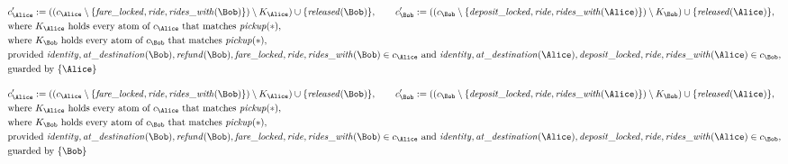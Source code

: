 \begin{align*}
&
c'_
{
\Alice
}
 := 
(
(c_
{
\Alice
}
 \setminus 
\{
\mathit{\detokenize{
fare_locked
}}
,
\mathit{\detokenize{
ride
}}
,
\mathit{\detokenize{
rides_with
}}
(
\Bob
)
\}
) \setminus K_
{
\Alice
}
) \cup 
\{
\mathit{\detokenize{
released
}}
(
\Bob
)
\}
, \qquad 
c'_
{
\Bob
}
 := 
(
(c_
{
\Bob
}
 \setminus 
\{
\mathit{\detokenize{
deposit_locked
}}
,
\mathit{\detokenize{
ride
}}
,
\mathit{\detokenize{
rides_with
}}
(
\Alice
)
\}
) \setminus K_
{
\Bob
}
) \cup 
\{
\mathit{\detokenize{
released
}}
(
\Alice
)
\}
,\\
&
\text{where } K_
{
\Alice
}
 \text{ holds every atom of } c_
{
\Alice
}
 \text{ that matches } 
\mathit{\detokenize{
pickup
}}
(
\ast
)
,\\
&
\text{where } K_
{
\Bob
}
 \text{ holds every atom of } c_
{
\Bob
}
 \text{ that matches } 
\mathit{\detokenize{
pickup
}}
(
\ast
)
,\\
&
\text{provided } 
\mathit{\detokenize{
identity
}}
,
\mathit{\detokenize{
at_destination
}}
(
\Bob
)
,
\mathit{\detokenize{
refund
}}
(
\Bob
)
,
\mathit{\detokenize{
fare_locked
}}
,
\mathit{\detokenize{
ride
}}
,
\mathit{\detokenize{
rides_with
}}
(
\Bob
)
 \in c_
{
\Alice
}
 \text{ and } 
\mathit{\detokenize{
identity
}}
,
\mathit{\detokenize{
at_destination
}}
(
\Alice
)
,
\mathit{\detokenize{
deposit_locked
}}
,
\mathit{\detokenize{
ride
}}
,
\mathit{\detokenize{
rides_with
}}
(
\Alice
)
 \in c_
{
\Bob
}
,\\
&
\text{guarded by } \{
\Alice
\}
\end{align*}

\begin{align*}
&
c'_
{
\Alice
}
 := 
(
(c_
{
\Alice
}
 \setminus 
\{
\mathit{\detokenize{
fare_locked
}}
,
\mathit{\detokenize{
ride
}}
,
\mathit{\detokenize{
rides_with
}}
(
\Bob
)
\}
) \setminus K_
{
\Alice
}
) \cup 
\{
\mathit{\detokenize{
released
}}
(
\Bob
)
\}
, \qquad 
c'_
{
\Bob
}
 := 
(
(c_
{
\Bob
}
 \setminus 
\{
\mathit{\detokenize{
deposit_locked
}}
,
\mathit{\detokenize{
ride
}}
,
\mathit{\detokenize{
rides_with
}}
(
\Alice
)
\}
) \setminus K_
{
\Bob
}
) \cup 
\{
\mathit{\detokenize{
released
}}
(
\Alice
)
\}
,\\
&
\text{where } K_
{
\Alice
}
 \text{ holds every atom of } c_
{
\Alice
}
 \text{ that matches } 
\mathit{\detokenize{
pickup
}}
(
\ast
)
,\\
&
\text{where } K_
{
\Bob
}
 \text{ holds every atom of } c_
{
\Bob
}
 \text{ that matches } 
\mathit{\detokenize{
pickup
}}
(
\ast
)
,\\
&
\text{provided } 
\mathit{\detokenize{
identity
}}
,
\mathit{\detokenize{
at_destination
}}
(
\Bob
)
,
\mathit{\detokenize{
refund
}}
(
\Bob
)
,
\mathit{\detokenize{
fare_locked
}}
,
\mathit{\detokenize{
ride
}}
,
\mathit{\detokenize{
rides_with
}}
(
\Bob
)
 \in c_
{
\Alice
}
 \text{ and } 
\mathit{\detokenize{
identity
}}
,
\mathit{\detokenize{
at_destination
}}
(
\Alice
)
,
\mathit{\detokenize{
deposit_locked
}}
,
\mathit{\detokenize{
ride
}}
,
\mathit{\detokenize{
rides_with
}}
(
\Alice
)
 \in c_
{
\Bob
}
,\\
&
\text{guarded by } \{
\Bob
\}
\end{align*}
